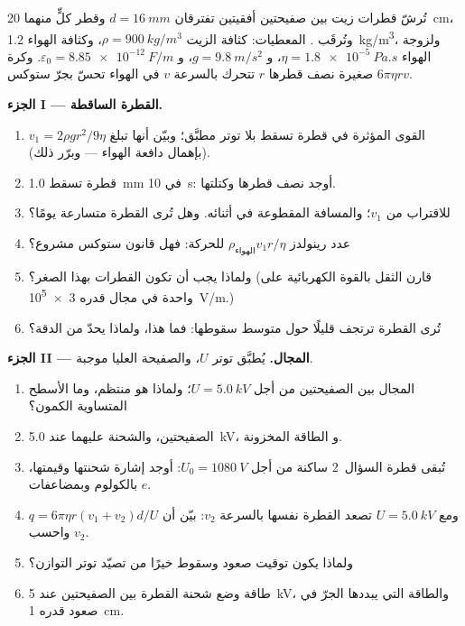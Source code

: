 \begin{problem}
\label{pb:b1:potential-capacitors:1}
تُرشّ قطرات زيت بين صفيحتين أفقيتين تفترقان $d = \qty{16}{mm}$
وقطر كلٍّ منهما \qty{20}{cm}، وتُرقَب .
المعطيات: كثافة الزيت $\rho = \qty{900}{kg/m^3}$، وكثافة الهواء
\qty{1.2}{kg/m^3}، ولزوجة الهواء $\eta = \qty{1.8e-5}{Pa.s}$، و $g =
\qty{9.8}{m/s^2}$، و $\varepsilon_0 = \qty{8.85e-12}{F/m}$. وكرة صغيرة
نصف قطرها $r$ تتحرك بالسرعة $v$ في الهواء تحسّ بجرّ ستوكس $6\pi\eta rv$.

\medskip
\noindent\textbf{الجزء I --- القطرة الساقطة.}
\begin{enumerate}
  \item القوى المؤثرة في قطرة تسقط بلا توتر مطبَّق؛ وبيّن أنها
        تبلغ  $v_1 = 2\rho gr^2/9\eta$ (بإهمال
        دافعة الهواء --- وبرّر ذلك).
  \item قطرة تسقط \qty{1.0}{mm} في \qty{10}{s}: أوجد نصف قطرها وكتلتها.
  \item {} للاقتراب من $v_1$؛ والمسافة المقطوعة
        في أثنائه. وهل تُرى القطرة متسارعة يومًا؟
  \item عدد رينولدز $\rho_{\text{الهواء}}v_1r/\eta$ للحركة: فهل
        قانون ستوكس مشروع؟
  \item ولماذا يجب أن تكون القطرات بهذا الصغر؟ (قارن الثقل بالقوة
        الكهربائية على  واحدة في مجال قدره
        \qty{3e5}{V/m}.)
  \item تُرى القطرة ترتجف قليلًا حول متوسط سقوطها: فما هذا،
        ولماذا يحدّ من الدقة؟
\end{enumerate}

\medskip
\noindent\textbf{الجزء II --- المجال.}
يُطبَّق توتر $U$، والصفيحة العليا موجبة.
\begin{enumerate}[resume]
  \item المجال بين الصفيحتين من أجل $U = \qty{5.0}{kV}$؛ ولماذا هو
        منتظم، وما الأسطح المتساوية الكمون؟
  \item {} الصفيحتين، والشحنة عليهما عند \qty{5.0}{kV}، و
        الطاقة المخزونة.
  \item تُبقى قطرة السؤال~2 ساكنة من أجل $U_0 = \qty{1080}{V}$:
        أوجد إشارة شحنتها وقيمتها، بالكولوم وبمضاعفات $e$.
  \item ومع $U = \qty{5.0}{kV}$ تصعد القطرة نفسها بالسرعة $v_2$: بيّن أن
        $q = 6\pi\eta r(v_1 + v_2)d/U$ واحسب $v_2$.
  \item ولماذا يكون توقيت صعود وسقوط خيرًا من تصيّد توتر
        التوازن؟
  \item طاقة وضع شحنة القطرة بين الصفيحتين عند
        \qty{5}{kV}، والطاقة التي يبددها الجرّ في صعود قدره
        \qty{1}{cm}.
\end{enumerate}


\end{problem}
